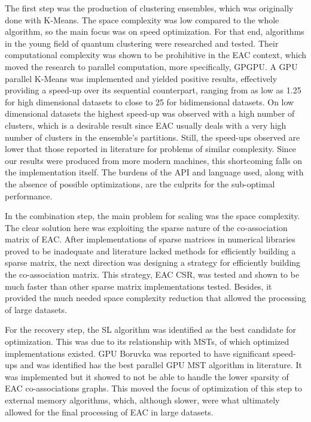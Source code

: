 The first step was the production of clustering ensembles, which was originally done with K-Means.
The space complexity was low compared to the whole algorithm, so the main focus was on speed optimization.
For that end, algorithms in the young field of quantum clustering were researched and tested.
Their computational complexity was shown to be prohibitive in the EAC context, which moved the research to parallel computation, more specifically, GPGPU.
A GPU parallel K-Means was implemented and yielded positive results, effectively providing a speed-up over its sequential counterpart, ranging from as low as 1.25 for high dimensional datasets to close to 25 for bidimensional datasets.
On low dimensional datasets the highest speed-up was observed with a high number of clusters, which is a desirable result since EAC usually deals with a very high number of clusters in the ensemble's partitions.
Still, the speed-ups observed are lower that those reported in literature for problems of similar complexity.
Since our results were produced from more modern machines, this shortcoming falls on the implementation itself.
The burdens of the API and language used, along with the absence of possible optimizations, are the culprits for the sub-optimal performance.

In the combination step, the main problem for scaling was the space complexity.
The clear solution here was exploiting the sparse nature of the co-association matrix of EAC.
After implementations of sparse matrices in numerical libraries proved to be inadequate and literature lacked methods for efficiently building a sparse matrix, the next direction was designing a strategy for efficiently building the co-association matrix.
This strategy, EAC CSR, was tested and shown to be much faster than other sparse matrix implementations tested.
Besides, it provided the much needed space complexity reduction that allowed the processing of large datasets.

For the recovery step, the SL algorithm was identified as the best candidate for optimization.
This was due to its relationship with MSTs, of which optimized implementations existed.
GPU Boruvka was reported to have significant speed-ups and was identified has the best parallel GPU MST algorithm in literature.
It was implemented but it showed to not be able to handle the lower sparsity of EAC co-associations graphs.
This moved the focus of optimization of this step to external memory algorithms, which, although slower, were what ultimately allowed for the final processing of EAC in large datasets.

